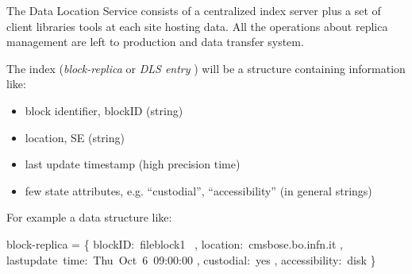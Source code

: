 \documentclass[pdftex]{cmspaper}
\begin{document}
The Data Location Service consists of a centralized index 
server plus a set of client libraries tools at each site hosting data. 
All the operations about replica management are left to production
and data transfer system.

The index ({\em block-replica} or {\em DLS entry} ) will be a structure containing 
information like: 
\begin{itemize}
\item block identifier, blockID  (string)
\item location, SE (string)
\item last update timestamp (high precision time)
\item few state attributes, e.g. ``custodial'', ``accessibility'' (in general strings)
\end{itemize}

For example a data structure like:
\begin{flushleft}
\mbox{block-replica} = \{
     \mbox{blockID: fileblock1 } ,
     \mbox{location: cmsbose.bo.infn.it} ,
     \mbox{lastupdate time: Thu Oct 6 09:00:00} ,
     \mbox{custodial:       yes} ,
     \mbox{accessibility:   disk}
 \}
\end{flushleft}
\end{document}
